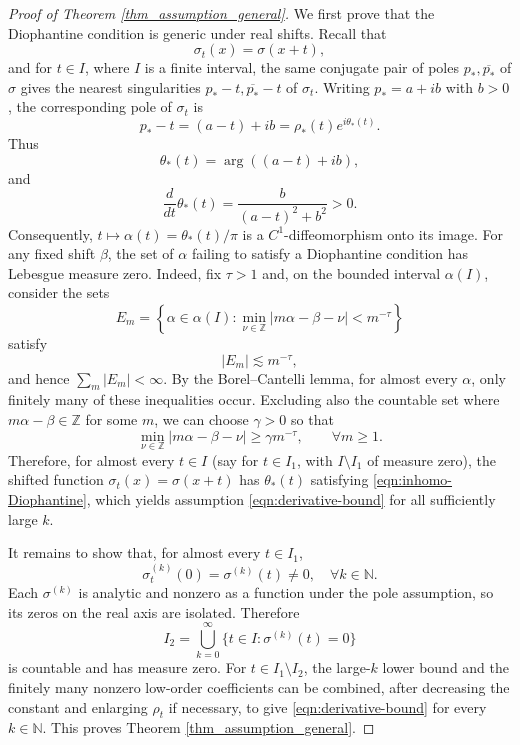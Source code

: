 \documentclass{article}
\numberwithin{equation}{section}
\def\NN{\mathbb{N}}
\begin{document}
    \begin{proof}[Proof of Theorem \ref{thm_assumption_general}]
        We first prove that the Diophantine condition is generic under real shifts. Recall that
    $$
    \sigma_t(x)=\sigma(x+t),
    $$
    and for $t\in I$, where $I$ is a finite interval, the same conjugate pair of poles $p_\ast,\overline{p_\ast}$ of $\sigma$ gives the nearest singularities $p_\ast-t,\overline{p_\ast}-t$ of $\sigma_t$. Writing $p_\ast=a+ib$ with $b>0$, the corresponding pole of $\sigma_t$ is
    \[
    p_\ast-t=(a-t)+ib = 
    \rho_\ast(t)e^{i\theta_\ast(t)}.
    \]
    Thus
    \[
    \theta_\ast(t)=\arg((a-t)+ib),
    \]
    and
    \[
    \frac{d}{dt}\theta_\ast(t)
    =
    \frac{b}{(a-t)^2+b^2}
    > 0.
    \]
    Consequently, $t\mapsto \alpha(t)=\theta_\ast(t)/\pi$ is a $C^1$-diffeomorphism onto its image. For any fixed shift \(\beta\), the set of \(\alpha\) failing to satisfy a Diophantine condition has Lebesgue measure zero. Indeed, fix \(\tau>1\) and, on the bounded interval $\alpha(I)$, consider the sets
    \[
    E_m = 
    \left\{
    \alpha\in\alpha(I):\min_{\nu\in\mathbb Z}|m\alpha-\beta-\nu|<m^{-\tau}
    \right\}
    \]
    satisfy
    \[
    |E_m|\lesssim m^{-\tau},
    \]
    and hence \(\sum_m |E_m|<\infty\). By the Borel--Cantelli lemma, for almost every \(\alpha\), only finitely many of these inequalities occur. Excluding also the countable set where \(m\alpha-\beta\in\mathbb Z\) for some \(m\), we can choose \(\gamma>0\) so that
    \[
    \min_{\nu\in\mathbb Z}|m\alpha-\beta-\nu|
    \geq
    \gamma m^{-\tau},
    \qquad \forall m\geq 1.
    \]
    Therefore, for almost every \(t\in I\) (say for $t\in I_1$, with $I\setminus I_1$ of measure zero), the shifted function \(\sigma_t(x)=\sigma(x+t)\) has \(\theta_\ast(t)\) satisfying \eqref{eqn:inhomo-Diophantine}, which yields assumption \eqref{eqn:derivative-bound} for all sufficiently large $k$.

    It remains to show that, for almost every $t\in I_1$,
    $$\sigma_t^{(k)}(0)=\sigma^{(k)}(t)\neq 0,\quad \forall k\in\NN.$$
    Each $\sigma^{(k)}$ is analytic and nonzero as a function under the pole assumption, so its zeros on the real axis are isolated. Therefore
    $$ I_2 = \bigcup_{k=0}^\infty \{t\in I: \sigma^{(k)}(t) = 0\}$$
    is countable and has measure zero. For $t\in I_1\setminus I_2$, the large-$k$ lower bound and the finitely many nonzero low-order coefficients can be combined, after decreasing the constant and enlarging $\rho_t$ if necessary, to give \eqref{eqn:derivative-bound} for every $k\in\NN$. This proves Theorem \ref{thm_assumption_general}.
    \end{proof}
    
\end{document}
